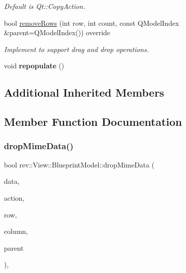 \begin{DoxyCompactItemize}
\begin{DoxyCompactList}\small\item\em Default is Qt\+::\+Copy\+Action. \end{DoxyCompactList}\item 
bool \mbox{\hyperlink{classrev_1_1_view_1_1_blueprint_model_ae6439b14843136ce564a2048cbc1d2fc}{remove\+Rows}} (int row, int count, const Q\+Model\+Index \&parent=Q\+Model\+Index()) override
\begin{DoxyCompactList}\small\item\em Implement to support drag and drop operations. \end{DoxyCompactList}\item 
\mbox{\label{classrev_1_1_view_1_1_blueprint_model_a9dc8dd59a6a325449ea921f20255fd49}} 
void {\bfseries repopulate} ()
\end{DoxyCompactItemize}
\subsection*{Additional Inherited Members}


\subsection{Member Function Documentation}
\mbox{\label{classrev_1_1_view_1_1_blueprint_model_ad000f8fdde3c606931a0121f6c5647d2}} 
\subsubsection{\texorpdfstring{dropMimeData()}{dropMimeData()}}
{\footnotesize\ttfamily bool rev\+::\+View\+::\+Blueprint\+Model\+::drop\+Mime\+Data (\begin{DoxyParamCaption}\item[{const Q\+Mime\+Data $\ast$}]{data,  }\item[{Qt\+::\+Drop\+Action}]{action,  }\item[{int}]{row,  }\item[{int}]{column,  }\item[{const Q\+Model\+Index \&}]{parent }\end{DoxyParamCaption})\hspace{0.3cm}{\ttfamily [override]}, {\ttfamily [virtual]}}



